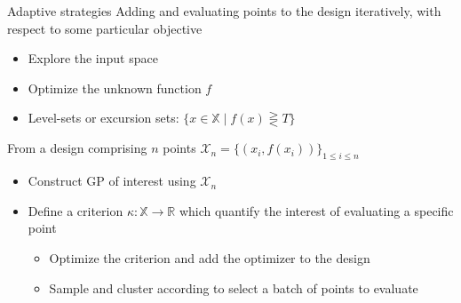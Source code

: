 \documentclass[10pt,aspectratio=169,usepdftitle=false]{beamer}
\newcommand{\Xspace}{\mathbb{X}}
\begin{document}
\begin{frame}{Adaptive strategies}
    Adding and evaluating points to the design iteratively, with
    respect to some particular objective
  \begin{itemize}
  \item Explore the input space
  \item Optimize the unknown function $f$
  \item Level-sets or excursion sets: $\{x \in \Xspace \mid f(x) \gtreqless T\}$
  \end{itemize}
  From a design comprising $n$ points $\mathcal{X}_n = \{(x_i, f(x_i))\}_{1 \leq i \leq n}$
  \begin{itemize}
  \item Construct GP of interest using $\mathcal{X}_n$
  \item Define a criterion $\kappa:\Xspace \rightarrow \mathbb{R}$
    which quantify the interest of evaluating a specific point
  \begin{itemize}
  \item Optimize the criterion and add the optimizer to the design
  \item Sample and cluster according to select a batch of points to evaluate
  \end{itemize}
  \end{itemize}
\end{frame}
\end{document}
